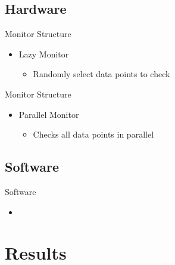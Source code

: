 \documentclass[t]{beamer}
\begin{document}
\subsection{Hardware}
\begin{frame}{Monitor Structure}
  \begin{itemize}
    \item Lazy Monitor
    \begin{itemize}
      \item Randomly select data points to check
    \end{itemize}
  \end{itemize}
  \begin{figure}[H]
    \centering
    \resizebox{0.8\textwidth}{!}{%
      
    }
  \end{figure}
\end{frame}

\begin{frame}{Monitor Structure}
  \begin{itemize}
    \item Parallel Monitor
    \begin{itemize}
      \item Checks all data points in parallel
    \end{itemize}
  \end{itemize}
  \begin{figure}[H]
    \centering
    \resizebox{0.8\textwidth}{!}{%
      
    }
  \end{figure}
\end{frame}

\subsection{Software}
\begin{frame}{Software}
\begin{itemize}
  \item 
\end{itemize}
\end{frame}

\section{Results}
\end{document}
